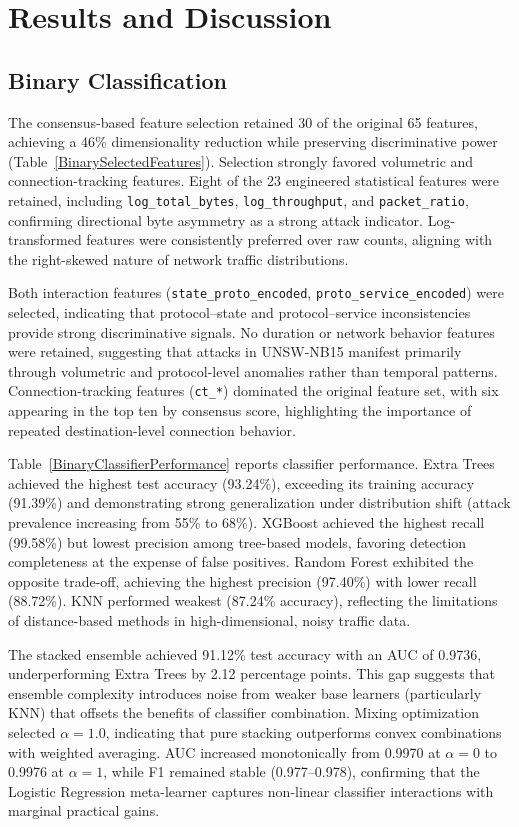 \documentclass[pdflatex,sn-mathphys-num]{sn-jnl}
\theoremstyle{thmstyleone}%
\theoremstyle{thmstyletwo}%
\theoremstyle{thmstylethree}%
\begin{document}
\section{Results and Discussion}
\subsection{Binary Classification}
The consensus-based feature selection retained 30 of the original 65 features, achieving a 46\% dimensionality reduction while preserving discriminative power (Table~\ref{BinarySelectedFeatures}). Selection strongly favored volumetric and connection-tracking features. Eight of the 23 engineered statistical features were retained, including \texttt{log\_total\_bytes}, \texttt{log\_throughput}, and \texttt{packet\_ratio}, confirming directional byte asymmetry as a strong attack indicator. Log-transformed features were consistently preferred over raw counts, aligning with the right-skewed nature of network traffic distributions.

Both interaction features (\texttt{state\_proto\_encoded}, \texttt{proto\_service\_encoded}) were selected, indicating that protocol--state and protocol--service inconsistencies provide strong discriminative signals. No duration or network behavior features were retained, suggesting that attacks in UNSW-NB15 manifest primarily through volumetric and protocol-level anomalies rather than temporal patterns. Connection-tracking features (\texttt{ct\_*}) dominated the original feature set, with six appearing in the top ten by consensus score, highlighting the importance of repeated destination-level connection behavior.

Table~\ref{BinaryClassifierPerformance} reports classifier performance. Extra Trees achieved the highest test accuracy (93.24\%), exceeding its training accuracy (91.39\%) and demonstrating strong generalization under distribution shift (attack prevalence increasing from 55\% to 68\%). XGBoost achieved the highest recall (99.58\%) but lowest precision among tree-based models, favoring detection completeness at the expense of false positives. Random Forest exhibited the opposite trade-off, achieving the highest precision (97.40\%) with lower recall (88.72\%). KNN performed weakest (87.24\% accuracy), reflecting the limitations of distance-based methods in high-dimensional, noisy traffic data.

The stacked ensemble achieved 91.12\% test accuracy with an AUC of 0.9736, underperforming Extra Trees by 2.12 percentage points. This gap suggests that ensemble complexity introduces noise from weaker base learners (particularly KNN) that offsets the benefits of classifier combination. Mixing optimization selected $\alpha = 1.0$, indicating that pure stacking outperforms convex combinations with weighted averaging. AUC increased monotonically from 0.9970 at $\alpha=0$ to 0.9976 at $\alpha=1$, while F1 remained stable (0.977--0.978), confirming that the Logistic Regression meta-learner captures non-linear classifier interactions with marginal practical gains.
\end{document}
